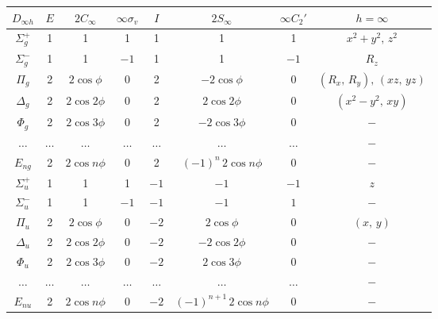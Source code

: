 \begin{center}
\begin{tabular}{ |c|c|c|c|c|c|c|c| }
 \hline
 $D_{\infty h}$ & $E$ & $2C_{\infty}$ & $\infty\sigma_v$ & $I$ & $2S_\infty$ & $\infty C_2'$ & $h=\infty$ \\
 \hline
 $\Sigma^+_g$ & 1 & 1 & 1 & 1 & 1 & 1 & $x^2+y^2,\,z^2$ \\
 \hline
 $\Sigma^-_g$ & 1 & 1 & $-1$ & 1 & 1 & $-1$ & $R_z$ \\
 \hline
 $\Pi_g$ & 2 & $2\cos{\phi}$ & $0$ & 2 & $-2\cos{\phi}$ & $0$ & $(R_x,\,R_y),\,(xz,\,yz)$ \\
 \hline
 $\Delta_g$ & 2 & $2\cos{2\phi}$ & $0$ & 2 & $2\cos{2\phi}$ & $0$ & $(x^2-y^2,\,xy)$ \\
 \hline
 $\Phi_g$ & 2 & $2\cos{3\phi}$ & $0$ & 2 & $-2\cos{3\phi}$ & $0$ & $-$ \\
 \hline
 $\ldots$ & $\ldots$ & $\ldots$ & $\ldots$ & $\ldots$ & $\ldots$ & $\ldots$ & $-$ \\
 \hline
 $E_{ng}$ & 2 & $2\cos{n\phi}$ & $0$ & 2 & $(-1)^n\,2\cos{n\phi}$ & $0$ & $-$ \\
 \hline
 $\Sigma^+_u$ & 1 & 1 & 1 & $-1$ & $-1$ & $-1$ & $z$ \\
 \hline
 $\Sigma^-_u$ & 1 & 1 & $-1$ & $-1$ & $-1$ & $1$ & $-$ \\
 \hline
 $\Pi_u$ & 2 & $2\cos{\phi}$ & $0$ & $-2$ & $2\cos{\phi}$ & $0$ & $(x,\,y)$ \\
 \hline
 $\Delta_u$ & 2 & $2\cos{2\phi}$ & $0$ & $-2$ & $-2\cos{2\phi}$ & $0$ & $-$ \\
 \hline
 $\Phi_u$ & 2 & $2\cos{3\phi}$ & $0$ & $-2$ & $2\cos{3\phi}$ & $0$ & $-$ \\
 \hline
 $\ldots$ & $\ldots$ & $\ldots$ & $\ldots$ & $\ldots$ & $\ldots$ & $\ldots$ & $-$ \\
 \hline
 $E_{nu}$ & 2 & $2\cos{n\phi}$ & $0$ & $-2$ & $(-1)^{n+1}\,2\cos{n\phi}$ & $0$ & $-$ \\
 \hline
\end{tabular}
\end{center}

